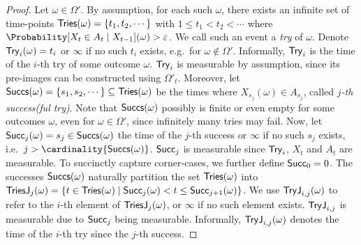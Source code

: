 \documentclass{article}
\begin{document}
\begin{proof}

	Let $\omega \in \Omega'$.
	By assumption, for each such $\omega$, there exists an infinite set of time-points $\tries(\omega) = \{t_1, t_2, \cdots\}$ with $1 \leq t_1 < t_2 < \cdots$ where $\Probability[X_t \in A_t \mid X_{t-1}](\omega) > \varepsilon$.
	We call such an event a \emph{try} of $\omega$.
	Denote $\ithtry<i>(\omega) = t_i$ or $\infty$ if no such $t_i$ exists, e.g.\ for $\omega \notin \Omega'$.
	Informally, $\ithtry<i>$ is the time of the $i$-th try of some outcome $\omega$.
	$\ithtry<i>$ is measurable by assumption, since its pre-images can be constructed using $\Omega'_t$.
	Moreover, let $\successes(\omega) = \{s_1, s_2, \cdots\} \subseteq \tries(\omega)$ be the times where $X_{s_j}(\omega) \in A_{s_j}$, called \emph{$j$-th success(ful try)}.
	Note that $\successes(\omega)$ possibly is finite or even empty for some outcomes $\omega$, even for $\omega \in \Omega'$, since infinitely many tries may fail.
	Now, let $\jthsuccess<j>(\omega) = s_j \in \successes(\omega)$ the time of the $j$-th success or $\infty$ if no such $s_j$ exists, i.e.\ $j > \cardinality{\successes(\omega)}$.
	$\jthsuccess<j>$ is measurable since $\ithtry<i>$, $X_t$ and $A_t$ are measurable.
	To succinctly capture corner-cases, we further define $\jthsuccess<0> = 0$.
	The successes $\successes(\omega)$ naturally partition the set $\tries(\omega)$ into $\triesafter<j>(\omega) = \{t \in \tries(\omega) \mid \jthsuccess<j>(\omega) < t \leq \jthsuccess<j+1>(\omega)\}$.
	We use $\ithtryafter<i><j>(\omega)$ to refer to the $i$-th element of $\triesafter<j>(\omega)$, or $\infty$ if no such element exists.
	$\ithtryafter<i><j>$ is measurable due to $\jthsuccess<j>$ being measurable.
	Informally, $\ithtryafter<i><j>(\omega)$ denotes the time of the $i$-th try since the $j$-th success.


\end{proof}
\end{document}
